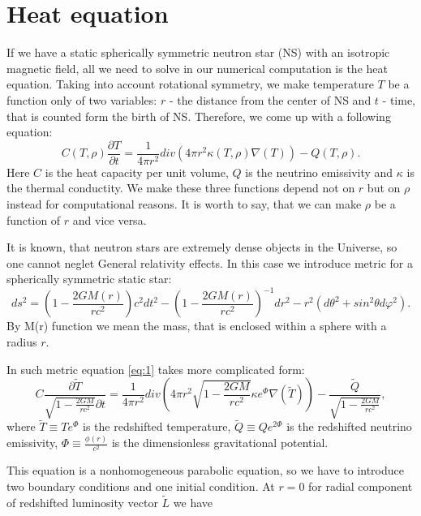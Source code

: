 \documentclass[preprint,pre,floats,aps,amsmath,amssymb]{revtex4}
\begin{document}
\section{Heat equation}
\par If we have a static spherically symmetric neutron star (NS) with an isotropic magnetic field, all we need to solve in our numerical computation is the heat equation. Taking into account rotational symmetry, we make temperature $T$ be a function only of two variables: $r$ - the distance from the center of NS  and $t$ - time, that is counted form the birth of NS.  Therefore, we come up with a following equation:
\begin{equation}
C(T,\rho)\frac{\partial T}{\partial t} = \frac{1}{4 \pi r^{2}}div(4 \pi r^{2}\kappa(T,\rho)\nabla(T)) - Q(T,\rho).
\label{eq:1}
\end{equation}
Here $C$ is the heat capacity per unit volume, $Q$  is the neutrino emissivity and $\kappa$ is the thermal conductity. We make these three functions depend not on $r$ but on $\rho$ instead for computational reasons. It is worth to say, that we can make $\rho$ be a function of $r$ and vice versa.
\par It is known, that neutron stars are extremely dense objects in the Universe, so one cannot neglet General relativity effects.  In this case we introduce metric for a spherically symmetric static star:
\begin{equation*}
ds^{2} = \left(1-\frac{2GM(r)}{rc^{2}}\right)c^{2}dt^{2} - \left(1-\frac{2GM(r)}{rc^{2}}\right)^{-1}dr^{2} - r^{2}\left(d\theta^{2}+sin^{2}\theta d\varphi^{2}\right).
\end{equation*}
By M(r) function we mean the mass, that is enclosed within a sphere with a radius $r$.
\par In such metric equation \ref{eq:1} takes more complicated form:
\begin{equation}
C\frac{\partial \tilde{T}}{\sqrt{1 - \frac{2GM}{rc^{2}}}\partial t} = \frac{1}{4\pi r^{2}}div\left(4\pi r^{2} \sqrt{1 - \frac{2GM}{rc^{2}}}\kappa e^{\Phi}\nabla(\tilde{T})\right) - \frac{\tilde{Q}}{\sqrt{1 - \frac{2GM}{rc^{2}}}},
\label{eq:2}
\end{equation}
where $\tilde{T} \equiv Te^{\Phi}$  is the redshifted temperature, $\tilde{Q} \equiv Qe^{2\Phi}$ is the redshifted neutrino emissivity, $\Phi \equiv \frac{\phi(r)}{c^{2}}$ is the dimensionless gravitational potential. 
\par This equation is a nonhomogeneous parabolic equation, so we have to introduce two boundary conditions and one initial condition. At $r=0$ for radial component of redshifted luminosity vector $\tilde{L}$ we have
\end{document}
